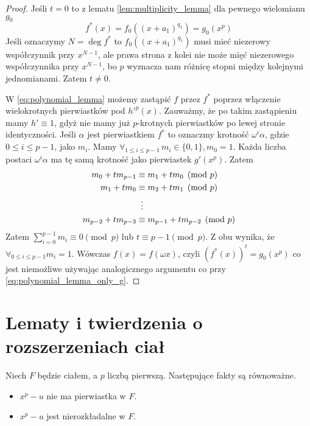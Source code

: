 \begin{proof}
  Jeśli $t=0$ to z lematu \ref{lem:multiplicity_lemma} dla pewnego wielomianu
  $g_0$
  \begin{equation}
   f^*(x) = f_0 \left(\left(x + a_1 \right)^{q_1} \right) = g_0 \left( x^p
  \right)
  \label{eq:polynomial_lemma_only_g}
  \end{equation}
  Jeśli oznaczymy $N = \deg f^*$ to $f_0 \left(\left(x + a_1 \right)^{q_1}
  \right)$ musi mieć niezerowy współczynnik przy $x^{N-1}$, ale prawa strona z
  kolei nie może mięć niezerowego współczynnika przy $x^{N-1}$, bo $p$ wyznacza
  nam różnicę stopni między kolejnymi jednomianami. Zatem $t \neq 0$.

  W \ref{eq:polynomial_lemma} możemy zastąpić $f$ przez $f^*$ poprzez włączenie
  wielokrotnych pierwiastków pod $h'^p(x)$. Zauważmy, że po takim zastąpieniu
  mamy $h' \equiv 1$, gdyż nie mamy już $p$-krotnych pierwiastków po lewej
  stronie identyczności. Jeśli $\alpha$ jest pierwiastkiem $f^*$ to oznaczmy
  krotność $\omega^i\alpha$, gdzie $0 \leq i \leq p - 1$, jako $m_i$. Mamy
  $\forall_{1 \leq i \leq p - 1} \, m_i \in \{0, 1\}, m_0 = 1$.  Każda liczba
  postaci $\omega^i\alpha$ ma tę samą krotność jako pierwiastek $g' \left( x^p
  \right)$. Zatem
  \begin{align*}
    m_0 + tm_{p-1} &\equiv m_1 + tm_0 \pmod{p}\\
    m_1 + tm_{0} &\equiv m_2 + tm_1 \pmod{p}\\
                 &\mathrel{\makebox[\widthof{=}]{\vdots}}\\
    m_{p-2} + tm_{p-3} &\equiv m_{p-1} + tm_{p-2} \pmod{p}
  \end{align*}
  Zatem $\sum_{i=0}^{p-1} m_i \equiv 0 \pmod{p}$ lub $t \equiv p-1 \pmod{p}$. Z
  obu wynika, że $\forall_{0 \leq i \leq p-1} m_i = 1$. Wówczas $f(x) = f(\omega
  x)$, czyli $\left( f^*(x) \right)^t = g_0 \left( x^p \right)$ co jest
  niemożliwe używając analogicznego argumentu co przy
  \ref{eq:polynomial_lemma_only_g}.
\end{proof}

\section{Lematy i twierdzenia o rozszerzeniach ciał}
\begin{theorem}
  Niech $F$ będzie ciałem, a $p$ liczbą pierwszą. Następujące fakty są
  równoważne.

  \begin{itemize}
    \item $x^p - u$ nie ma pierwiastka w $F$.
    \item $x^p - u$ jest nierozkładalne w $F$.
  \end{itemize}
  \label{th:14_1_1}
\end{theorem}

